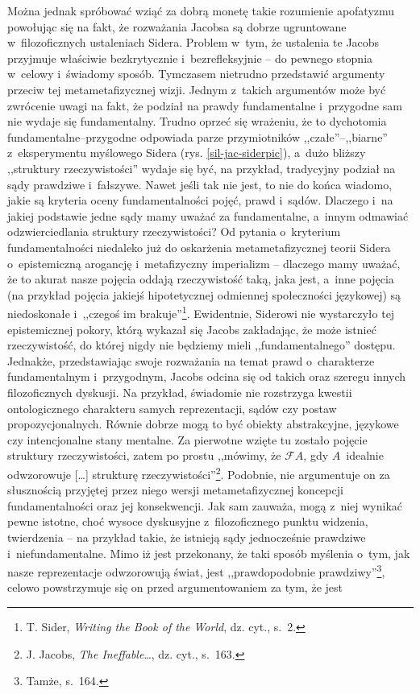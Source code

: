 Można jednak spróbować wziąć za dobrą monetę takie rozumienie apofatyzmu powołując się na fakt, że rozważania Jacobsa są dobrze ugruntowane w~filozoficznych ustaleniach Sidera. Problem w~tym, że ustalenia te Jacobs przyjmuje właściwie bezkrytycznie i~bezrefleksyjnie -- do pewnego stopnia w~celowy i~świadomy sposób. Tymczasem nietrudno przedstawić argumenty przeciw tej metametafizycznej wizji. Jednym z~takich argumentów może być zwrócenie uwagi na fakt, że podział na prawdy fundamentalne i~przygodne sam nie wydaje się fundamentalny. Trudno oprzeć się wrażeniu, że to dychotomia fundamentalne–przygodne odpowiada parze przymiotników ,,czałe''–,,biarne'' z~eksperymentu myślowego Sidera (rys. \ref{sil-jac-siderpic}), a~dużo bliższy ,,struktury rzeczywistości'' wydaje się być, na przykład, tradycyjny podział na sądy prawdziwe i~fałszywe. Nawet jeśli tak nie jest, to nie do końca wiadomo, jakie są kryteria oceny fundamentalności pojęć, prawd i~sądów. Dlaczego i~na jakiej podstawie jedne sądy mamy uważać za fundamentalne, a~innym odmawiać odzwierciedlania struktury rzeczywistości? Od pytania o~kryterium fundamentalności niedaleko już do oskarżenia metametafizycznej teorii Sidera o~epistemiczną arogancję i~metafizyczny imperializm -- dlaczego mamy uważać, że to akurat nasze pojęcia oddają rzeczywistość taką, jaka jest, a~inne pojęcia (na przykład pojęcia jakiejś hipotetycznej odmiennej społeczności językowej) są niedoskonałe i~,,czegoś im brakuje''\footnote{T. Sider, \textit{Writing the Book of the World}, dz. cyt., s.~2.}. Ewidentnie, Siderowi nie wystarczyło tej epistemicznej pokory, którą wykazał się Jacobs zakładając, że może istnieć rzeczywistość, do której nigdy nie będziemy mieli ,,fundamentalnego'' dostępu. Jednakże, przedstawiając swoje rozważania na temat prawd o~charakterze fundamentalnym i~przygodnym, Jacobs odcina się od takich oraz szeregu innych filozoficznych dyskusji. Na przykład, świadomie nie rozstrzyga kwestii ontologicznego charakteru samych reprezentacji, sądów czy postaw propozycjonalnych. Równie dobrze mogą to być obiekty abstrakcyjne, językowe czy intencjonalne stany mentalne. Za pierwotne wzięte tu zostało pojęcie struktury rzeczywistości, zatem po prostu ,,mówimy, że \guillemotleft$\mathscr{F}A$\guillemotright, gdy $A$~idealnie odwzorowuje [\ldots] strukturę rzeczywistości''\footnote{J. Jacobs, \textit{The Ineffable}\ldots, dz. cyt., s.~163.}. Podobnie, nie argumentuje on za słusznością przyjętej przez niego wersji metametafizycznej koncepcji fundamentalności oraz jej konsekwencji. Jak sam zauważa, mogą z~niej wynikać pewne istotne, choć wysoce dyskusyjne z~filozoficznego punktu widzenia, twierdzenia -- na przykład takie, że istnieją sądy jednocześnie prawdziwe i~niefundamentalne. Mimo iż jest przekonany, że taki sposób myślenia o~tym, jak nasze reprezentacje odwzorowują świat, jest ,,prawdopodobnie prawdziwy''\footnote{Tamże, s.~164.}, celowo powstrzymuje się on przed argumentowaniem za tym, że jest
